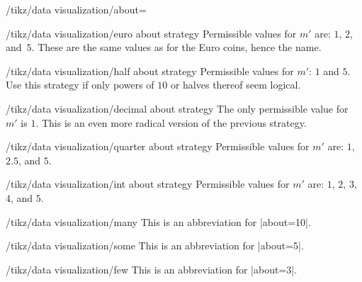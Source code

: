\begin{key}{/tikz/data visualization/about=}
    \begin{key}{/tikz/data visualization/euro about strategy}
        Permissible values for $m'$ are: $1$, $2$, and~$5$. These are the same
        values as for the Euro coins, hence the name.

    \end{key}

    \begin{key}{/tikz/data visualization/half about strategy}
        Permissible values for $m'$: $1$ and $5$. Use this strategy if only
        powers of $10$ or halves thereof seem logical.

    \end{key}

    \begin{key}{/tikz/data visualization/decimal about strategy}
        The only permissible value for $m'$ is $1$. This is an even more
        radical version of the previous strategy.

    \end{key}

    \begin{key}{/tikz/data visualization/quarter about strategy}
        Permissible values for $m'$ are: $1$, $2.5$, and $5$.

    \end{key}

    \begin{key}{/tikz/data visualization/int about strategy}
        Permissible values for $m'$ are: $1$, $2$, $3$, $4$, and $5$.

    \end{key}
\end{key}

\begin{key}{/tikz/data visualization/many}
    This is an abbreviation for |about=10|.
\end{key}

\begin{key}{/tikz/data visualization/some}
    This is an abbreviation for |about=5|.
\end{key}

\begin{key}{/tikz/data visualization/few}
    This is an abbreviation for |about=3|.
\end{key}

